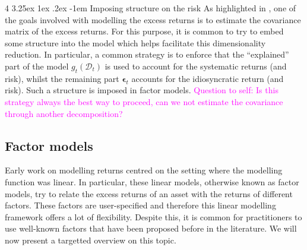 \documentclass[12pt]{article}
\makeatletter
\renewcommand\paragraph{%
	\@startsection{paragraph}
	{4}
	{\z@}
	{3.25ex \@plus1ex \@minus.2ex}
	{-1em}
	{\normalfont\normalsize\bfseries\maybe@addperiod}%
}
\newcommand{\maybe@addperiod}[1]{%
	#1\@addpunct{.}%
}
\let\cref\crtcref
\makeatother
\begin{document}
\paragraph{Imposing structure on the risk} As highlighted in \cref{sec:mean_variance}, one of the goals involved with modelling the excess returns is to estimate the covariance matrix of the excess returns. For this purpose, it is common to try to embed some structure into the model which helps facilitate this dimensionality reduction. In particular, a common strategy is to enforce that the ``explained'' part of the model $g_t(\mathcal{D}_t)$ is used to account for the systematic returns (and risk), whilst the remaining part $\boldsymbol{\epsilon}_t$ accounts for the idiosyncratic return (and risk). Such a structure is imposed in factor models. \textcolor{magenta}{Question to self: Is this strategy always the best way to proceed, can we not estimate the covariance through another decomposition?}

\subsection{Factor models}
\label{sec:factor_models}
Early work on modelling returns centred on the setting where the modelling function was linear. In particular, these linear models, otherwise known as factor models, try to relate the excess returns of an asset with the returns of different factors. These factors are user-specified and therefore this linear modelling framework offers a lot of flexibility. Despite this, it is common for practitioners to use well-known factors that have been proposed before in the literature. We will now present a targetted overview on this topic. 
\end{document}
